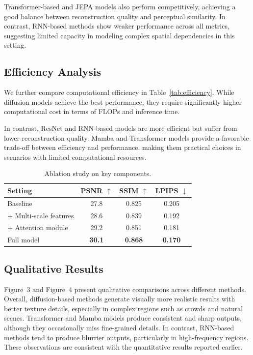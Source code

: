 Transformer-based and JEPA models also perform competitively, achieving a good 
balance between reconstruction quality and perceptual similarity. In contrast, 
RNN-based methods show weaker performance across all metrics, suggesting limited 
capacity in modeling complex spatial dependencies in this setting.

\subsection{Efficiency Analysis}

We further compare computational efficiency in Table~\ref{tab:efficiency}. 
While diffusion models achieve the best performance, they require significantly 
higher computational cost in terms of FLOPs and inference time. 

In contrast, ResNet and RNN-based models are more efficient but suffer from lower 
reconstruction quality. Mamba and Transformer models provide a favorable trade-off 
between efficiency and performance, making them practical choices in scenarios 
with limited computational resources.

\begin{table}[t]
\centering
\caption{Ablation study on key components.}
\label{tab:ablation}
\setlength{\tabcolsep}{4pt}
\begin{tabular}{lccc}
\toprule
Setting & PSNR $\uparrow$ & SSIM $\uparrow$ & LPIPS $\downarrow$ \\
\midrule
Baseline                & 27.8 & 0.825 & 0.205 \\
+ Multi-scale features  & 28.6 & 0.839 & 0.192 \\
+ Attention module      & 29.2 & 0.851 & 0.181 \\
Full model              & \textbf{30.1} & \textbf{0.868} & \textbf{0.170} \\
\bottomrule
\end{tabular}
\end{table}

\subsection{Qualitative Results}

Figure~3 and Figure~4 present qualitative comparisons across different methods. 
Overall, diffusion-based methods generate visually more realistic results with 
better texture details, especially in complex regions such as crowds and natural scenes. 
%
Transformer and Mamba models produce consistent and sharp outputs, although they 
occasionally miss fine-grained details. In contrast, RNN-based methods tend to 
produce blurrier outputs, particularly in high-frequency regions. These observations 
are consistent with the quantitative results reported earlier.

